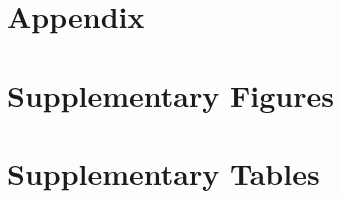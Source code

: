 \documentclass{article}
\newcommand{\beginsupplement}{
	\setcounter{table}{0}
	\renewcommand{\thetable}{S\arabic{table}}
	\setcounter{figure}{0}
	\renewcommand{\thefigure}{S\arabic{figure}}
}
\begin{document}
	\pagebreak
	
	
	
	
	\beginsupplement
	
	\pagebreak
	
	\section*{Appendix}
	
	
	
	\pagebreak
	
	\section*{Supplementary Figures}
	
	
	
	\pagebreak
	
	\section*{Supplementary Tables}
	
	
	
\end{document}
